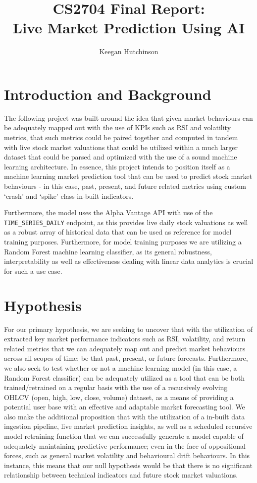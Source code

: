 \documentclass[runningheads]{llncs}
\title{CS2704 Final Report:\\Live Market Prediction Using AI}
\author{Keegan Hutchinson}
\institute{Faculty of Computer Science\\
University of New Brunswick Saint John\\
\email{khutchi3@unb.ca}\\
(Solo Submission)}
\begin{document}
\maketitle


\section{Introduction and Background}
The following project was built around the idea that given market behaviours can be adequately mapped out with the use of KPIs such as RSI and volatility metrics, that such metrics could be paired together and computed in tandem with live stock market valuations that could be utilized within a much larger dataset that could be parsed and optimized with the use of a sound machine learning architecture. In essence, this project intends to position itself as a machine learning market prediction tool that can be used to predict stock market behaviours - in this case, past, present, and future related metrics using custom ‘crash’ and ‘spike’ class in-built indicators.

Furthermore, the model uses the Alpha Vantage API with use of the \texttt{TIME\_SERIES\_DAILY} endpoint, as this provides live daily stock valuations as well as a robust array of historical data that can be used as reference for model training purposes. Furthermore, for model training purposes we are utilizing a Random Forest machine learning classifier, as its general robustness, interpretability as well as effectiveness dealing with linear data analytics is crucial for such a use case.

\section{Hypothesis}
For our primary hypothesis, we are seeking to uncover that with the utilization of
extracted key market performance indicators such as RSI, volatility, and return
related metrics that we can adequately map out and predict market behaviours
across all scopes of time; be that past, present, or future forecasts. Furthermore,
we also seek to test whether or not a machine learning model (in this case,
a Random Forest classifier) can be adequately utilized as a tool that can be
both trained/retrained on a regular basis with the use of a recursively evolving
OHLCV (open, high, low, close, volume) dataset, as a means of providing a
potential user base with an effective and adaptable market forecasting tool. We
also make the additional proposition that with the utilization of a in-built data
ingestion pipeline, live market prediction insights, as well as a scheduled recursive
model retraining function that we can successfully generate a model capable of
adequately maintaining predictive performance; even in the face of oppositional
forces, such as general market volatility and behavioural drift behaviours. In this instance, this means that our null hypothesis would be that there is no significant relationship between technical indicators and future stock market valuations.
\end{document}
